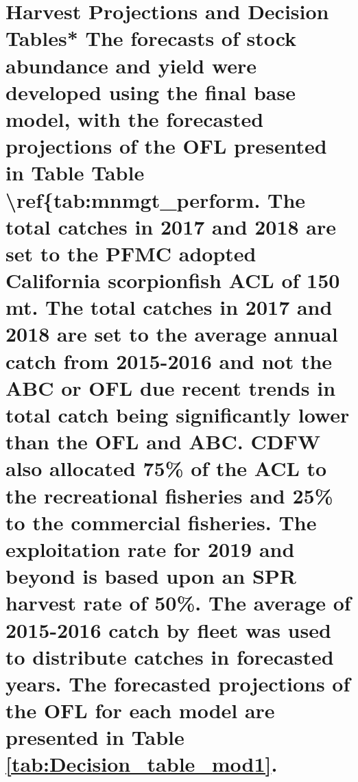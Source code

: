 \documentclass[12pt,]{article}
\begin{document}
\section{\texorpdfstring{Harvest Projections and Decision Tables* The
forecasts of stock abundance and yield were developed using the final
base model, with the forecasted projections of the OFL presented in
Table Table \textbackslash{}ref\{tab:mnmgt\_perform. The total catches
in 2017 and 2018 are set to the PFMC adopted California scorpionfish ACL
of 150 mt. The total catches in 2017 and 2018 are set to the average
annual catch from 2015-2016 and not the ABC or OFL due recent trends in
total catch being significantly lower than the OFL and ABC. CDFW also
allocated 75\% of the ACL to the recreational fisheries and 25\% to the
commercial fisheries. The exploitation rate for 2019 and beyond is based
upon an SPR harvest rate of 50\%. The average of 2015-2016 catch by
fleet was used to distribute catches in forecasted years. The forecasted
projections of the OFL for each model are presented in Table
\ref{tab:Decision_table_mod1}.}{Harvest Projections and Decision Tables* The forecasts of stock abundance and yield were developed using the final base model, with the forecasted projections of the OFL presented in Table Table \textbackslash{}ref\{tab:mnmgt\_perform. The total catches in 2017 and 2018 are set to the PFMC adopted California scorpionfish ACL of 150 mt. The total catches in 2017 and 2018 are set to the average annual catch from 2015-2016 and not the ABC or OFL due recent trends in total catch being significantly lower than the OFL and ABC. CDFW also allocated 75\% of the ACL to the recreational fisheries and 25\% to the commercial fisheries. The exploitation rate for 2019 and beyond is based upon an SPR harvest rate of 50\%. The average of 2015-2016 catch by fleet was used to distribute catches in forecasted years. The forecasted projections of the OFL for each model are presented in Table .}}\label{harvest-projections-and-decision-tables-the-forecasts-of-stock-abundance-and-yield-were-developed-using-the-final-base-model-with-the-forecasted-projections-of-the-ofl-presented-in-table-table-reftabmnmgt_perform.-the-total-catches-in-2017-and-2018-are-set-to-the-pfmc-adopted-california-scorpionfish-acl-of-150-mt.-the-total-catches-in-2017-and-2018-are-set-to-the-average-annual-catch-from-2015-2016-and-not-the-abc-or-ofl-due-recent-trends-in-total-catch-being-significantly-lower-than-the-ofl-and-abc.-cdfw-also-allocated-75-of-the-acl-to-the-recreational-fisheries-and-25-to-the-commercial-fisheries.-the-exploitation-rate-for-2019-and-beyond-is-based-upon-an-spr-harvest-rate-of-50.-the-average-of-2015-2016-catch-by-fleet-was-used-to-distribute-catches-in-forecasted-years.-the-forecasted-projections-of-the-ofl-for-each-model-are-presented-in-table-.}
\end{document}
